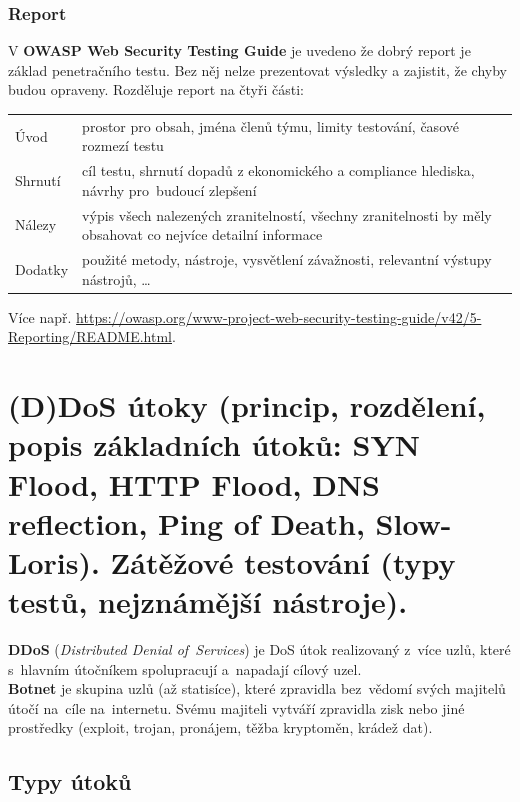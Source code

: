 \subsubsection{Report}

V \textbf{OWASP Web Security Testing Guide} je uvedeno že dobrý report je základ penetračního testu. Bez něj nelze prezentovat výsledky a zajistit, že chyby budou opraveny. Rozděluje report na čtyři části:

\begin{table}[ht]
    \centering
    \begin{tabular}{p{1.5cm}|p{13.5cm}}
        Úvod    & prostor pro obsah, jména členů týmu, limity testování, časové rozmezí testu                                 \\
        Shrnutí & cíl testu, shrnutí dopadů z ekonomického a compliance hlediska, návrhy pro~budoucí zlepšení                 \\
        Nálezy  & výpis všech nalezených zranitelností, všechny zranitelnosti by měly obsahovat co nejvíce detailní informace \\
        Dodatky & použité metody, nástroje, vysvětlení závažnosti, relevantní výstupy nástrojů, \dots                         \\
    \end{tabular}
\end{table}

Více např. \url{https://owasp.org/www-project-web-security-testing-guide/v42/5-Reporting/README.html}.


\clearpage
\section{(D)DoS útoky (princip, rozdělení, popis základních útoků: SYN Flood, HTTP Flood, DNS reflection, Ping of Death, Slow-Loris). Zátěžové testování (typy testů, nejznámější nástroje).}

\textbf{DDoS} (\emph{Distributed Denial of~Services}) je DoS útok realizovaný z~více uzlů, které s~hlavním útočníkem spolupracují a~napadají cílový uzel. \\
\textbf{Botnet} je skupina uzlů (až statisíce), které zpravidla bez~vědomí svých majitelů útočí na~cíle na~internetu. Svému majiteli vytváří zpravidla zisk nebo jiné prostředky (exploit, trojan, pronájem, těžba kryptoměn, krádež dat).

\subsection{Typy útoků}

